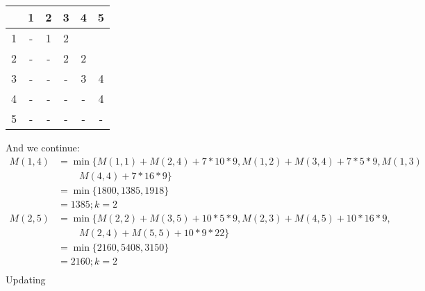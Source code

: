 \documentclass[12pt]{article}
\begin{document}
\begin{table}[h]
\centering
\begin{tabular}{|c|c|c|c|c|c|}
\hline
\multicolumn{1}{|l|}{} & \multicolumn{1}{|l|}{1} & \multicolumn{1}{l|}{2} & \multicolumn{1}{l|}{3} & \multicolumn{1}{l|}{4} & \multicolumn{1}{l|}{5} \\ \hline
1&  -                   &     1                 &        2               &                       &                   \\ \hline
2&-                       & -                     &      2                 &     2                  &                   \\ \hline
3&-                       & -                     & -                     &     3                  &      4                 \\ \hline
4&-                       & -                     & -                     & -                     &   4                    \\ \hline
5&-                       & -                     & -                     & -                     &   -                   \\ \hline
\end{tabular}
\end{table}
And we continue:
\begin{align*}
M(1,4) & = \min \{ M(1,1) + M(2,4) +7*10*9 , M(1,2) + M(3,4) + 7*5*9, M(1,3) \\
            &~~~~~~~~~~   M(4,4) +7*16*9 \}\\
            & = \min \{1800, 1385, 1918 \} \\
            & = 1385; k=2\\
M(2,5) & = \min \{ M(2,2) + M(3,5) + 10*5*9, M(2,3) + M(4,5) +10*16*9 ,\\
            &~~~~~~~~~~ M(2,4) + M(5,5) +10*9*22 \}\\
           & = \min \{ 2160, 5408, 3150 \}\\
           & = 2160; k=2\\
\end{align*}
Updating
\end{document}
